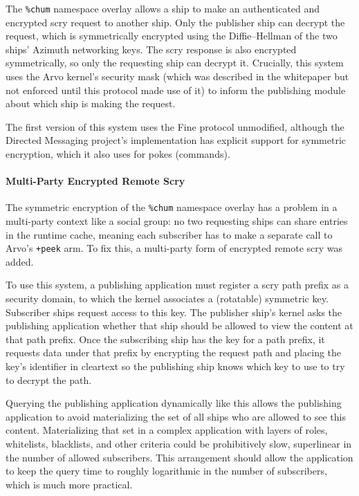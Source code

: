\documentclass[twoside]{article}
\begin{document}
The \lstinline[style=inlinecode]{%chum} namespace overlay allows a ship to make an authenticated and encrypted scry request to another ship.  Only the publisher ship can decrypt the request, which is symmetrically encrypted using the Diffie–Hellman of the two ships' Azimuth networking keys.  The scry response is also encrypted symmetrically, so only the requesting ship can decrypt it.  Crucially, this system uses the Arvo kernel's security mask (which was described in the whitepaper but not enforced until this protocol made use of it) to inform the publishing module about which ship is making the request.

The first version of this system uses the Fine protocol unmodified, although the Directed Messaging project's implementation has explicit support for symmetric encryption, which it also uses for pokes (commands).

\paragraph{Multi-Party Encrypted Remote Scry}

The symmetric encryption of the \lstinline[style=inlinecode]{%chum} namespace overlay has a problem in a multi-party context like a social group: no two requesting ships can share entries in the runtime cache, meaning each subscriber has to make a separate call to Arvo's \lstinline[style=inlinecode]{+peek} arm.  To fix this, a multi-party form of encrypted remote scry was added.

To use this system, a publishing application must register a scry path prefix as a security domain, to which the kernel associates a (rotatable) symmetric key.  Subscriber ships request access to this key.  The publisher ship's kernel asks the publishing application whether that ship should be allowed to view the content at that path prefix.  Once the subscribing ship has the key for a path prefix, it requests data under that prefix by encrypting the request path and placing the key's identifier in cleartext so the publishing ship knows which key to use to try to decrypt the path.

Querying the publishing application dynamically like this allows the publishing application to avoid materializing the set of all ships who are allowed to see this content.  Materializing that set in a complex application with layers of roles, whitelists, blacklists, and other criteria could be prohibitively slow, superlinear in the number of allowed subscribers.  This arrangement should allow the application to keep the query time to roughly logarithmic in the number of subscribers, which is much more practical.
\end{document}
